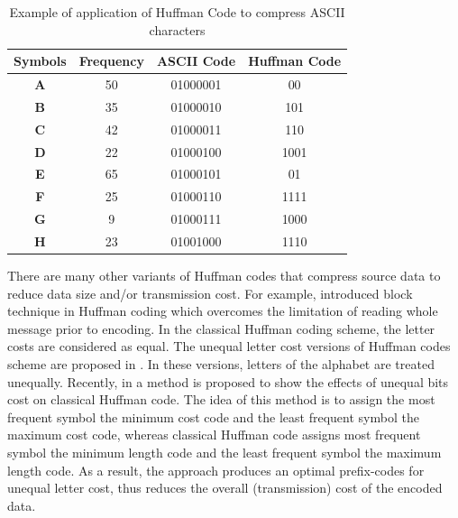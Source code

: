 \documentclass{singlecol-new}
\theoremstyle{TH}{
\newtheorem{lemma}{Lemma}
\newtheorem{theorem}[lemma]{Theorem}
\newtheorem{corrolary}[lemma]{Corrolary}
\newtheorem{conjecture}[lemma]{Conjecture}
\newtheorem{proposition}[lemma]{Proposition}
\newtheorem{claim}[lemma]{Claim}
\newtheorem{stheorem}[lemma]{Wrong Theorem}
}
\theoremstyle{THrm}{
\newtheorem{definition}{Definition}
\newtheorem{question}{Question}
\newtheorem{remark}{Remark}
\newtheorem{scheme}{Scheme}
}
\theoremstyle{THhit}{
\newtheorem{case}{Case}[section]
}
\begin{document}
\begin{table}[h]
\renewcommand{\arraystretch}{1.3}
\caption{Example of application of Huffman Code to compress ASCII characters}
\label{table2}
\begin{tabular}{  c  c  c  c }
\toprule
 Symbols & Frequency& ASCII Code & Huffman Code \\
\hline
\bfseries A & 50&01000001&00\\
\bfseries B & 35&01000010&101\\
\bfseries C & 42&01000011&110\\
\bfseries D & 22&01000100&1001\\
\bfseries E & 65&01000101&01\\
\bfseries F & 25&01000110&1111\\
\bfseries G & 9&01000111&1000\\
\bfseries H & 23&01001000&1110\\
\bottomrule
\end{tabular}
\end{table}

There are many other variants of Huffman codes that compress source data to reduce data size and/or transmission cost. For example, \citet{Kay03} introduced block technique in Huffman coding which overcomes the limitation of reading whole message prior to encoding. In the classical Huffman coding scheme, the letter costs are considered as equal. The unequal letter cost versions of Huffman codes scheme are proposed in \citep{Gol1996,Gol02,Gol2002,Gol12}.
In these versions, letters  of  the alphabet  are  treated  unequally. Recently, in \citep{Kab14} a method is proposed to show the effects of unequal bits cost on classical Huffman code. The idea of this method is to assign the most frequent symbol the minimum cost code and the least frequent symbol the maximum cost code, whereas classical Huffman code assigns most frequent symbol the minimum length code and the least frequent symbol the maximum length code. As a result, the approach produces an optimal prefix-codes for unequal letter cost, thus reduces the overall (transmission) cost of the encoded data. 
\end{document}
